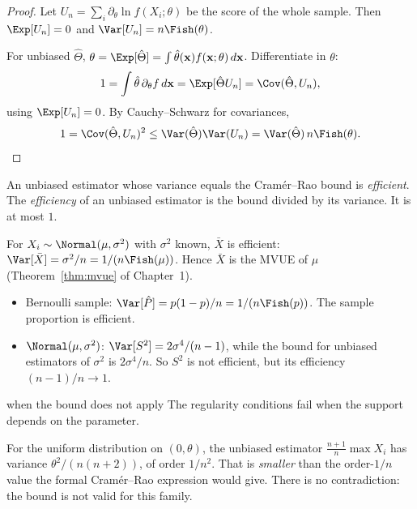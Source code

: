 \begin{proof}
Let $U_n=\sum_i\partial_\theta\ln f(X_i;\theta)$ be the score of the whole sample. Then $\Exp[U_n]=0$ and $\Var[U_n]=n\Fish(\theta)$.

For unbiased $\hat\Theta$, $\theta=\Exp[\hat\Theta]=\int\hat\theta(\mathbf{x})f(\mathbf{x};\theta)\,d\mathbf{x}$. Differentiate in $\theta$:
\[ 1=\int\hat\theta\,\partial_\theta f\,d\mathbf{x}=\Exp[\hat\Theta U_n]=\Cov(\hat\Theta,U_n), \]
using $\Exp[U_n]=0$. By Cauchy--Schwarz for covariances,
\[ 1=\Cov(\hat\Theta,U_n)^2\le\Var(\hat\Theta)\Var(U_n)=\Var(\hat\Theta)\,n\Fish(\theta). \]
\end{proof}

\begin{definition}
An unbiased estimator whose variance equals the Cram\'er--Rao bound is \emph{efficient}. The \emph{efficiency} of an unbiased estimator is the bound divided by its variance. It is at most $1$.
\end{definition}

\begin{theorem}\label{thm:mvue-proof}
For $X_i\sim\Normal(\mu,\sigma^2)$ with $\sigma^2$ known, $\bar{X}$ is efficient: $\Var[\bar{X}]=\sigma^2/n=1/(n\Fish(\mu))$. Hence $\bar{X}$ is the MVUE of $\mu$ (Theorem~\ref{thm:mvue} of Chapter~1).
\end{theorem}

\begin{example}
\begin{itemize}
  \item Bernoulli sample: $\Var[\hat{P}]=p(1-p)/n=1/(n\Fish(p))$. The sample proportion is efficient.
  \item $\Normal(\mu,\sigma^2)$: $\Var[S^2]=2\sigma^4/(n-1)$, while the bound for unbiased estimators of $\sigma^2$ is $2\sigma^4/n$. So $S^2$ is not efficient, but its efficiency $(n-1)/n\to1$.
\end{itemize}
\end{example}

\begin{pitfall}{when the bound does not apply}
The regularity conditions fail when the support depends on the parameter.

For the uniform distribution on $(0,\theta)$, the unbiased estimator $\frac{n+1}n\max X_i$ has variance $\theta^2/(n(n+2))$, of order $1/n^2$. That is \emph{smaller} than the order-$1/n$ value the formal Cram\'er--Rao expression would give. There is no contradiction: the bound is not valid for this family.
\end{pitfall}

